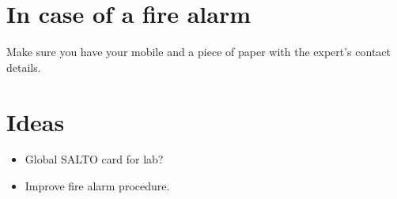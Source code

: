 \documentclass[12pt, oneside, a4paper]{article}
\begin{document}
\section{In case of a fire alarm}

Make sure you have your mobile and a piece of paper with the expert's contact details.

\section{Ideas}
\begin{itemize}
	\item Global SALTO card for lab?
      \item Improve fire alarm procedure.
\end{itemize}
\end{document}
